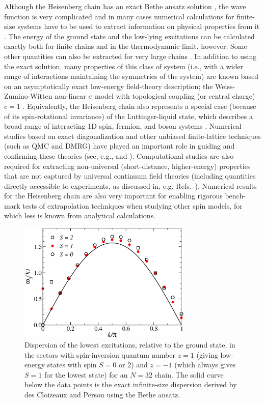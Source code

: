 \documentclass[draft,numberedheadings]{aipproc}
\begin{document}
Although the Heisenberg chain has an exact Bethe ansatz solution \cite{bethe}, the wave function is very complicated and in many cases numerical calculations 
for finite-size systems have to be used to extract information on physical properties from it \cite{caux,maillet}. The energy of the ground state \cite{hulthen} 
and the low-lying excitations \cite{cloizeaux} can be calculated exactly both for finite chains and in the thermodynamic limit, however.  Some other quantities 
can also be extracted for very large chains \cite{eckel}. In addition to using the exact solution, many properties of this class of system (i.e., with a wider
range of interactions maintaining the symmetries of the system) are known based on an asymptotically exact low-energy field-theory description; the 
Weiss-Zumino-Witten non-linear $\sigma$ model with topological coupling (or central charge) $c=1$ \cite{affleck1}. Equivalently, the Heisenberg chain also 
represents a special case (because of its spin-rotational invariance) of the Luttinger-liquid state, which describes a broad range of interacting 1D spin,
fermion, and boson systems \cite{schulz90,voit}. Numerical studies based on exact diagonalization and other unbiased finite-lattice techniques (such as QMC and 
DMRG) have played an important role in guiding and confirming these theories (see, e.g., \cite{affleck3} and \cite{eggert94}). Computational studies are also 
required for extracting non-universal (short-distance, higher-energy) properties that are not captured by universal continuum field theories 
(including quantities directly accessible to experiments, as discussed in, e.g, Refs.~\cite{lorenzana,takigawa}). Numerical results for the Heisenberg chain are 
also very important for enabling rigorous bench-mark tests of extrapolation techniques when studying other spin models, for which less is known from 
analytical calculations. 

\begin{figure}
\includegraphics[width=8.25cm, clip]{eq32.eps}
\caption{Dispersion of the lowest excitations, relative to the ground state, in the sectors with spin-inversion quantum number $z=1$ (giving low-energy states 
with spin $S=0$ or $2$) and $z=-1$ (which always gives $S=1$ for the lowest state) for an $N=32$ chain. The solid curve below the data points is the exact 
infinite-size dispersion derived by des Cloizeaux and Person \cite{cloizeaux} using the Bethe ansatz.} 
\label{eq32}
\end{figure}
\end{document}
